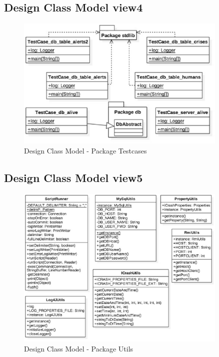 \subsection{Design Class Model view4}
\begin{figure}[h!]
	\centering
	\includegraphics[width=0.9\textwidth]{./images/dcm_testcases.eps}
	\caption{Design Class Model - Package Testcases}
\end{figure}

\subsection{Design Class Model view5}
\begin{figure}[h!]
	\centering
	\includegraphics[width=0.9\textwidth]{./images/dcm_utils.eps}
	\caption{Design Class Model - Package Utils}
\end{figure}

